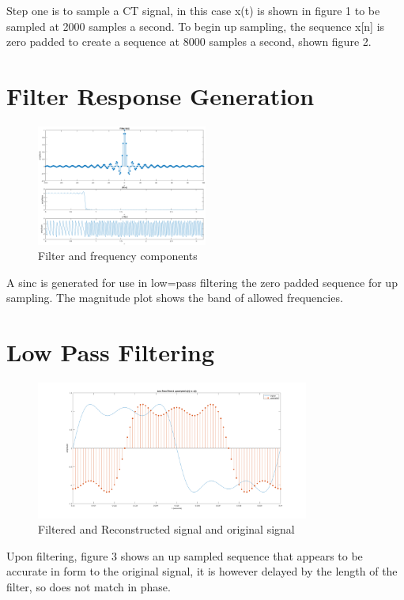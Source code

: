 \documentclass[11pt]{article}
\begin{document}
Step one is to sample a CT signal, in this case x(t) is shown in figure 1 to be sampled at 2000 samples a second.
To begin up sampling, the sequence x[n] is zero padded to create a sequence at 8000 samples a second, shown figure 2.

\section{Filter Response Generation}
\begin{figure}[!h]
	\centering
	\includegraphics[width=0.5\textwidth]{fig3}
	\caption{Filter and frequency components}
\end{figure}

A sinc is generated for use in low=pass filtering the zero padded sequence for up sampling. The magnitude plot shows the band of allowed frequencies.

\newpage
\section{Low Pass Filtering}

\begin{figure}[!h]
	\centering
	\includegraphics[width=0.8\textwidth]{fig4}
	\caption{Filtered and Reconstructed signal and original signal}
\end{figure}

Upon filtering, figure 3 shows an up sampled sequence that appears to be accurate in form to the original signal, it is however delayed by the length of the filter, so does not match in phase.
\end{document}
